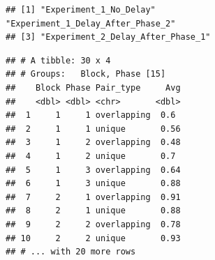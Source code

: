 \documentclass[
  english,
  man]{article}
\begin{document}
\begin{verbatim}
## [1] "Experiment_1_No_Delay"            "Experiment_1_Delay_After_Phase_2"
## [3] "Experiment_2_Delay_After_Phase_1"
\end{verbatim}

\begin{verbatim}
## # A tibble: 30 x 4
## # Groups:   Block, Phase [15]
##    Block Phase Pair_type     Avg
##    <dbl> <dbl> <chr>       <dbl>
##  1     1     1 overlapping  0.6 
##  2     1     1 unique       0.56
##  3     1     2 overlapping  0.48
##  4     1     2 unique       0.7 
##  5     1     3 overlapping  0.64
##  6     1     3 unique       0.88
##  7     2     1 overlapping  0.91
##  8     2     1 unique       0.88
##  9     2     2 overlapping  0.78
## 10     2     2 unique       0.93
## # ... with 20 more rows
\end{verbatim}
\end{document}
